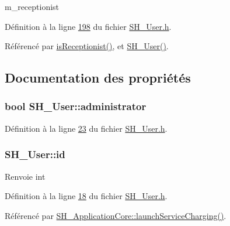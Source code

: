 m\-\_\-receptionist 



Définition à la ligne \hyperlink{SH__User_8h_source_l00198}{198} du fichier \hyperlink{SH__User_8h_source}{S\-H\-\_\-\-User.\-h}.



Référencé par \hyperlink{classSH__User_a6e78a5559a202eb3f2bd79e50768da7f}{is\-Receptionist()}, et \hyperlink{classSH__User_a96c0ebb3f11c1654935aaecb92295724}{S\-H\-\_\-\-User()}.



\subsection{Documentation des propriétés}
\hypertarget{classSH__User_ab57f23cf224a8c5bdd191ca501549220}{
\subsubsection[{administrator}]{\setlength{\rightskip}{0pt plus 5cm}bool S\-H\-\_\-\-User\-::administrator\hspace{0.3cm}{\ttfamily [read]}}}\label{classSH__User_ab57f23cf224a8c5bdd191ca501549220}


Définition à la ligne \hyperlink{SH__User_8h_source_l00023}{23} du fichier \hyperlink{SH__User_8h_source}{S\-H\-\_\-\-User.\-h}.

\hypertarget{classSH__User_a187ee34e1d6d3466f3852e091cdb69e9}{
\subsubsection[{id}]{\setlength{\rightskip}{0pt plus 5cm}S\-H\-\_\-\-User\-::id\hspace{0.3cm}{\ttfamily [read]}}}\label{classSH__User_a187ee34e1d6d3466f3852e091cdb69e9}
\begin{DoxyReturn}{Renvoie}
int 
\end{DoxyReturn}


Définition à la ligne \hyperlink{SH__User_8h_source_l00018}{18} du fichier \hyperlink{SH__User_8h_source}{S\-H\-\_\-\-User.\-h}.



Référencé par \hyperlink{classSH__ApplicationCore_a74af071d9fefb1f0c3373e6501d04d62}{S\-H\-\_\-\-Application\-Core\-::launch\-Service\-Charging()}.

